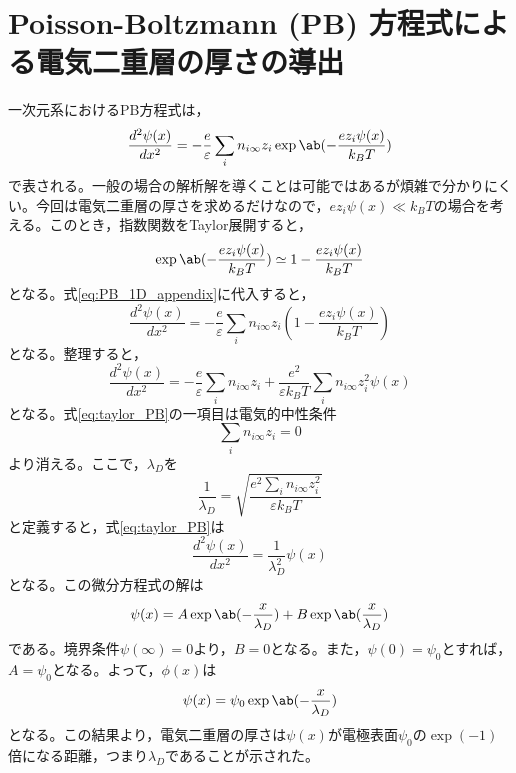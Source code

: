 \documentclass[autodetect-engine,dvi=dvipdfmx,a4paper,ja=standard,oneside,openany,11pt]{bxjsbook}
\begin{document}
\chapter{Poisson-Boltzmann (PB) 方程式による電気二重層の厚さの導出}
\label{sec:PB}
一次元系におけるPB方程式は，
\begin{equation}
  \frac{d^2\psi(x)}{dx^2} = -\frac{e}{\varepsilon}\sum_{i}n_{i\infty}z_i\exp\ab(-\frac{ez_i\psi(x)}{k_BT})
  \label{eq:PB_1D_appendix}
\end{equation}
で表される。一般の場合の解析解を導くことは可能ではあるが煩雑で分かりにくい。今回は電気二重層の厚さを求めるだけなので，$ ez_i\psi(x)\ll k_B T$の場合を考える。このとき，指数関数をTaylor展開すると，
\begin{equation}
  \exp\ab(-\frac{ez_i\psi(x)}{k_BT})\simeq 1-\frac{ez_i\psi(x)}{k_BT}
\end{equation}
となる。式\eqref{eq:PB_1D_appendix}に代入すると，
\begin{equation}
  \frac{d^2\psi(x)}{dx^2} = -\frac{e}{\varepsilon}\sum_{i}n_{i\infty}z_i\left(1-\frac{ez_i\psi(x)}{k_BT}\right)
\end{equation}
となる。整理すると，
\begin{equation}
  \frac{d^2\psi(x)}{dx^2} = -\frac{e}{\varepsilon}\sum_{i}n_{i\infty}z_i+\frac{e^2}{\varepsilon k_BT}\sum_{i}n_{i\infty}z_i^2\psi(x)
  \label{eq:taylor_PB}
\end{equation}
となる。式\eqref{eq:taylor_PB}の一項目は電気的中性条件
\begin{equation}
  \sum_{i}n_{i\infty}z_i=0
\end{equation}
より消える。ここで，$\lambda_D$を
\begin{equation}
  \frac{1}{\lambda_D}=\sqrt{\frac{e^2\sum_{i}n_{i\infty}z_i^2}{\varepsilon k_BT}}
\end{equation}
と定義すると，式\eqref{eq:taylor_PB}は
\begin{equation}
  \frac{d^2\psi(x)}{dx^2} = \frac{1}{\lambda_D^2}\psi(x)
\end{equation}
となる。この微分方程式の解は
\begin{equation}
  \psi(x)=A\exp\ab(-\frac{x}{\lambda_D})+B\exp\ab(\frac{x}{\lambda_D})
\end{equation}
である。境界条件$\psi(\infty)=0$より，$B=0$となる。また，$\psi(0)=\psi_0$とすれば，$A=\psi_0$となる。よって，$\phi(x)$は
\begin{equation}
  \psi(x)=\psi_0\exp\ab(-\frac{x}{\lambda_D})
\end{equation}
となる。この結果より，電気二重層の厚さは$\psi(x)$が電極表面$\psi_0$の$\exp(-1)$倍になる距離，つまり$\lambda_D$であることが示された。
\end{document}
